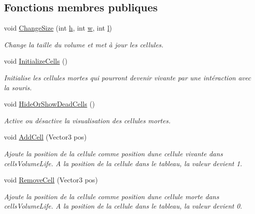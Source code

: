 \subsection*{Fonctions membres publiques}
\begin{DoxyCompactItemize}
\item 
void \mbox{\hyperlink{class_edit_mode_manager_acab9d2ee3853d18b73e82135d800c341}{Change\+Size}} (int \mbox{\hyperlink{class_edit_mode_manager_ad0e09cececc48bcb4e7b768fa35dc954}{h}}, int \mbox{\hyperlink{class_edit_mode_manager_ad9e4950cf24abf3ede8c0891c4df7b77}{w}}, int \mbox{\hyperlink{class_edit_mode_manager_a1979d9d74b3ead0806d3aa58f92a298c}{l}})
\begin{DoxyCompactList}\small\item\em Change la taille du volume et met à jour les cellules. \end{DoxyCompactList}\item 
void \mbox{\hyperlink{class_edit_mode_manager_a8a950f58c809a7161d85e5d9a73e4d15}{Initialize\+Cells}} ()
\begin{DoxyCompactList}\small\item\em Initialise les cellules mortes qui pourront devenir vivante par une intéraction avec la souris. \end{DoxyCompactList}\item 
void \mbox{\hyperlink{class_edit_mode_manager_ad64498838abd29826c929cad104924be}{Hide\+Or\+Show\+Dead\+Cells}} ()
\begin{DoxyCompactList}\small\item\em Active ou désactive la visualisation des cellules mortes. \end{DoxyCompactList}\item 
void \mbox{\hyperlink{class_edit_mode_manager_a9f9fbe57f5bbb6b90dc1dc321d411c54}{Add\+Cell}} (Vector3 pos)
\begin{DoxyCompactList}\small\item\em Ajoute la position de la cellule comme position d\textquotesingle{}une cellule vivante dans cells\+Volume\+Life. A la position de la cellule dans le tableau, la valeur devient 1. \end{DoxyCompactList}\item 
void \mbox{\hyperlink{class_edit_mode_manager_a8a8c1a3a9558fbbcfa7c15d8ce48a264}{Remove\+Cell}} (Vector3 pos)
\begin{DoxyCompactList}\small\item\em Ajoute la position de la cellule comme position d\textquotesingle{}une cellule morte dans cells\+Volume\+Life. A la position de la cellule dans le tableau, la valeur devient 0. \end{DoxyCompactList}\item 

\end{DoxyCompactItemize}

